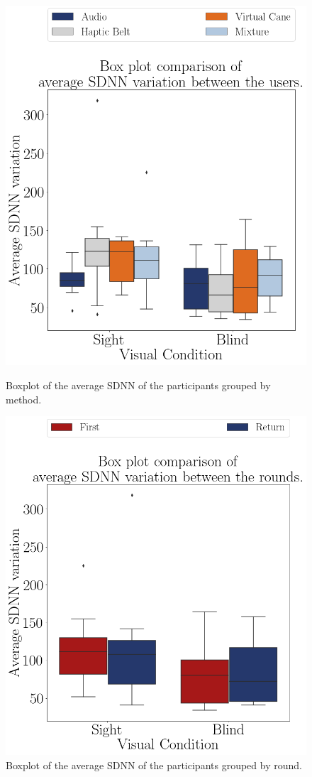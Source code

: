 \begin{figure}[!htb]
    \centering
    \begin{minipage}{0.45\textwidth}
        \centering
        \includegraphics[width = 0.8\linewidth]{Resultados/ECG/Figuras/png/boxplot_ecg_sdnn_4_scene.png}
        \caption{Boxplot of the average SDNN of the participants grouped by method.}
        \label{fig:boxplot_ecg_sdnn_4_scene}
    \end{minipage}
    \begin{minipage}{0.45\textwidth}
        \centering
        \includegraphics[width = 0.8\linewidth]{Resultados/ECG/Figuras/png/boxplot_ecg_sdnn_4_rounds.png}
        \caption{Boxplot of the average SDNN of the participants grouped by round.}
        \label{fig:boxplot_ecg_sdnn_4_rounds}
    \end{minipage}
\end{figure}
 
